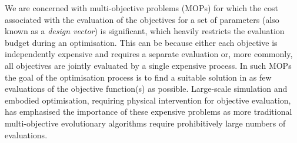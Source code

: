 \documentclass[conference]{IEEEtran}
\newcommand{\rmenote}[2][\textcolor{magenta}{\dagger}]{$#1$\marginpar{\color{magenta}\raggedright\tiny$#1$ #2}}
\begin{document}
We are concerned with multi-objective problems (MOPs) for which the cost associated with the evaluation of the objectives for a set of parameters (also known as a \emph{design vector}) is significant, which heavily restricts the evaluation budget during an  optimisation. This can be because either each objective is independently expensive and requires a separate evaluation or, more commonly, all objectives are jointly evaluated by a single expensive process. In such MOPs the goal of the optimisation process is to find a suitable solution in as few evaluations of the objective function(s) as possible.  Large-scale simulation and embodied optimisation, requiring physical intervention for objective evaluation, has emphasised the importance of these expensive problems \cite{osio1996engineering,  li2017rapid, jeong2005efficient, fang2017design, huband2005scalable} as more traditional multi-objective evolutionary algorithms require prohibitively large numbers of evaluations. 
\end{document}
